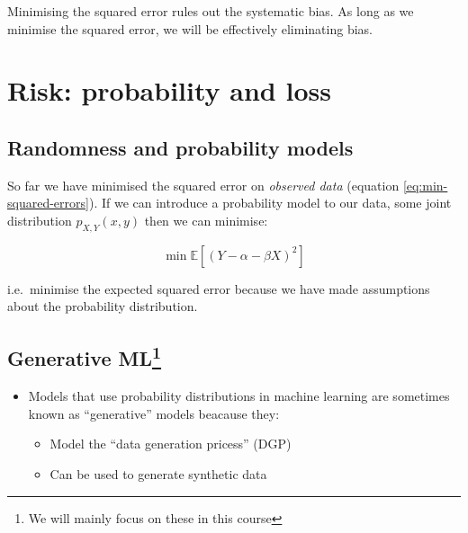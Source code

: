 \documentclass[
]{report}
\providecommand{\tightlist}{%
  \setlength{\itemsep}{0pt}\setlength{\parskip}{0pt}}
\renewenvironment{quote}{
	\bigskip\begin{mdframed}[
			skipabove=\topskip,
			skipbelow=\topskip,
			backgroundcolor=quoteshadecolor,
			leftmargin=0.5cm,
			rightmargin=0.5cm,
			topline=false,
			rightline=false,
			bottomline=false,
			nobreak=true,
		]\itshape%
		}{
	\end{mdframed}
}
\theoremstyle{definition}
\theoremstyle{definition}
\theoremstyle{definition}
\theoremstyle{definition}
\theoremstyle{remark}
\begin{document}
\begin{quote}
Minimising the squared error rules out the systematic bias. As long as we
minimise the squared error, we will be effectively eliminating bias.
\end{quote}

\hypertarget{risk-probability-and-loss}{%
\section{Risk: probability and loss}\label{risk-probability-and-loss}}

\hypertarget{randomness-and-probability-models}{%
\subsection{Randomness and probability models}\label{randomness-and-probability-models}}

So far we have minimised the squared error on \emph{observed data} (equation
\eqref{eq:min-squared-errors}). If we can introduce a probability model to our
data, some joint distribution \(p_{X,Y}(x,y)\) then we can minimise:

\begin{equation}
  \min \mathbb{E}[(Y - \alpha - \beta X)^{2}] \label{eq:ese}
\end{equation}

i.e.~minimise the expected squared error because we have made assumptions about
the probability distribution.

\hypertarget{generative-ml}{%
\subsection[Generative ML]{\texorpdfstring{Generative ML\footnote{We will mainly focus on these in this course}}{Generative ML}}\label{generative-ml}}

\begin{itemize}
\tightlist
\item
  Models that use probability distributions in machine learning are sometimes
  known as ``generative'' models beacause they:

  \begin{itemize}
  \tightlist
  \item
    Model the ``data generation pricess'' (DGP)
  \item
    Can be used to generate synthetic data
  \end{itemize}
\end{itemize}
\end{document}
